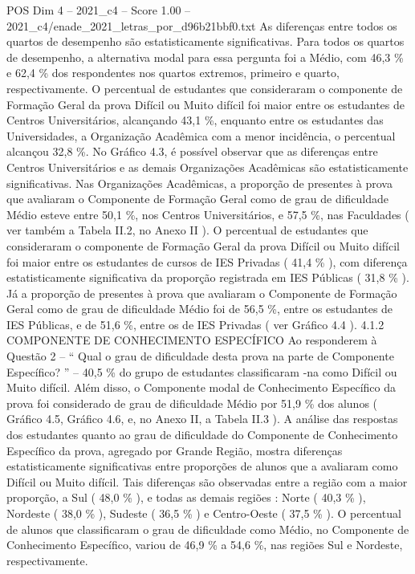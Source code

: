 \begin{textsample}{POS Dim 4 – 2021\_c4 – Score 1.00 – 2021\_c4/enade\_2021\_letras\_por\_d96b21bbf0.txt}
As diferenças entre todos os quartos de desempenho são estatisticamente significativas.
Para todos os quartos de desempenho, a alternativa modal para essa pergunta foi a Médio, com 46,3 \% e 62,4 \% dos respondentes nos quartos extremos, primeiro e quarto, respectivamente.
O percentual de estudantes que consideraram o componente de Formação Geral da prova Difícil ou Muito difícil foi maior entre os estudantes de Centros Universitários, alcançando 43,1 \%, enquanto entre os estudantes das Universidades, a Organização Acadêmica com a menor incidência, o percentual alcançou 32,8 \%.
No Gráfico 4.3, é possível observar que as diferenças entre Centros Universitários e as demais Organizações Acadêmicas são estatisticamente significativas.
Nas Organizações Acadêmicas, a proporção de presentes à prova que avaliaram o Componente de Formação Geral como de grau de dificuldade Médio esteve entre 50,1 \%, nos Centros Universitários, e 57,5 \%, nas Faculdades ( ver também a Tabela II.2, no Anexo II ).
O percentual de estudantes que consideraram o componente de Formação Geral da prova Difícil ou Muito difícil foi maior entre os estudantes de cursos de IES Privadas ( 41,4 \% ), com diferença estatisticamente significativa da proporção registrada em IES Públicas ( 31,8 \% ).
Já a proporção de presentes à prova que avaliaram o Componente de Formação Geral como de grau de dificuldade Médio foi de 56,5 \%, entre os estudantes de IES Públicas, e de 51,6 \%, entre os de IES Privadas ( ver Gráfico 4.4 ). 4.1.2 COMPONENTE DE CONHECIMENTO ESPECÍFICO Ao responderem à Questão 2 – “ Qual o grau de dificuldade desta prova na parte de Componente Específico? ” – 40,5 \% do grupo de estudantes classificaram -na como Difícil ou Muito difícil.
Além disso, o Componente modal de Conhecimento Específico da prova foi considerado de grau de dificuldade Médio por 51,9 \% dos alunos ( Gráfico 4.5, Gráfico 4.6, e, no Anexo II, a Tabela II.3 ).
A análise das respostas dos estudantes quanto ao grau de dificuldade do Componente de Conhecimento Específico da prova, agregado por Grande Região, mostra diferenças estatisticamente significativas entre proporções de alunos que a avaliaram como Difícil ou Muito difícil.
Tais diferenças são observadas entre a região com a maior proporção, a Sul ( 48,0 \% ), e todas as demais regiões : Norte ( 40,3 \% ), Nordeste ( 38,0 \% ), Sudeste ( 36,5 \% ) e Centro-Oeste ( 37,5 \% ).
O percentual de alunos que classificaram o grau de dificuldade como Médio, no Componente de Conhecimento Específico, variou de 46,9 \% a 54,6 \%, nas regiões Sul e Nordeste, respectivamente.

\end{textsample}
